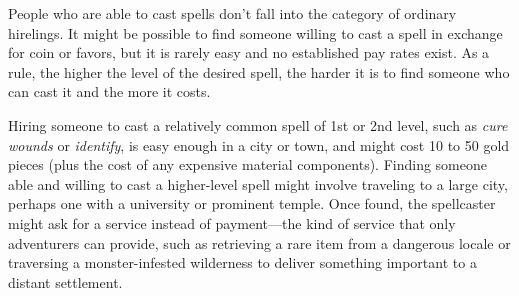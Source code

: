\documentclass[
]{article}
\begin{document}
People who are able to cast spells don't fall into the category of
ordinary hirelings. It might be possible to find someone willing to cast
a spell in exchange for coin or favors, but it is rarely easy and no
established pay rates exist. As a rule, the higher the level of the
desired spell, the harder it is to find someone who can cast it and the
more it costs.

Hiring someone to cast a relatively common spell of 1st or 2nd level,
such as \emph{cure wounds} or \emph{identify}, is easy enough in a city
or town, and might cost 10 to 50 gold pieces (plus the cost of any
expensive material components). Finding someone able and willing to cast
a higher-level spell might involve traveling to a large city, perhaps
one with a university or prominent temple. Once found, the spellcaster
might ask for a service instead of payment---the kind of service that
only adventurers can provide, such as retrieving a rare item from a
dangerous locale or traversing a monster-infested wilderness to deliver
something important to a distant settlement.
\end{document}

